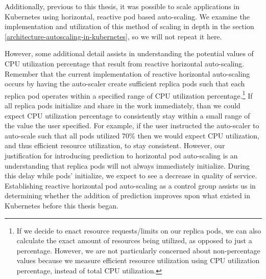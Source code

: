 Additionally, previous to this thesis, it was possible to scale applications in
Kubernetes using horizontal, reactive pod based auto-scaling. We examine the implementation
and utilization of this method of scaling in depth in the section
\ref{architecture-autoscaling-in-kubernetes}, so we will not repeat it here.

However, some additional detail assists in understanding the potential values of
CPU utilization percentage that result from reactive horizontal auto-scaling.
Remember that the current implementation of reactive horizontal auto-scaling
occurs by having the auto-scaler create sufficient replica pods such that each
replica pod operates within a specified range of CPU utilization percentage.\footnote{If
  we decide to enact resource requests/limits on our replica pods, we can also
calculate the exact amount of resources being utilized, as opposed to just a
percentage. However, we are not particularly concerned about non-percentage
values because we measure efficient resource utilization using CPU utilization
percentage, instead of total CPU utilization.} If all replica pods initialize
and share in the work immediately, than we could expect CPU utilization
percentage to consistently stay within a small range of the value the user
specified. For example, if the user instructed the auto-scaler to auto-scale
such that all pods utilized 70\%
then we would expect CPU utilization, and thus efficient resource utilization,
to stay consistent.
However, our justification for introducing prediction
to horizontal pod auto-scaling is an understanding that replica pods will not
always immediately initialize. During this delay while pods' initialize, we expect to see
a decrease in quality of service.
Establishing reactive horizontal pod auto-scaling as a control group
assists us in determining whether the addition of prediction improves upon what
existed in Kubernetes before this thesis began.
